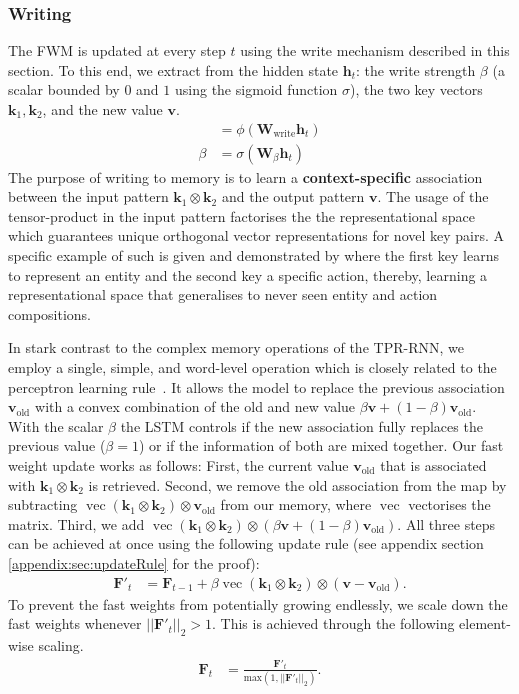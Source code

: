 \documentclass{article} \usepackage{iclr2021_conference,times}
\def\vh{{\bm{h}}}
\def\vk{{\bm{k}}}
\def\vv{{\bm{v}}}
\def\mF{{\bm{F}}}
\def\mW{{\bm{W}}}
\DeclareMathOperator{\vect}{vec}
\begin{document}
\subsubsection{Writing} \label{sec:fwmwiriting}
The FWM is updated at every step $t$ using the write mechanism described in this section.
To this end, we extract from the hidden state $\vh_t$: the write strength $\beta$ (a scalar bounded by $0$ and $1$ using the sigmoid function $\sigma$), the two key vectors $\vk_1, \vk_2$, and the new value $\vv$. 
\begin{align}
    [\vk_1, \vk_2, \vv] &= \phi(\mW_\text{write}\vh_t) \\
    \beta &= \sigma(\mW_\beta\vh_t)
\end{align}
The purpose of writing to memory is to learn a \textbf{context-specific} association between the input pattern $\vk_1 \otimes \vk_2$ and the output pattern $\vv$. 
The usage of the tensor-product in the input pattern factorises the the representational space which guarantees unique orthogonal vector representations for novel key pairs.
A specific example of such is given and demonstrated by \citet{schlag2018nips} where the first key learns to represent an entity and the second key a specific action, thereby, learning a representational space that generalises to never seen entity and action compositions.

In stark contrast to the complex memory operations of the TPR-RNN, we employ a single, simple, and word-level operation which is closely related to the perceptron learning rule~\citep{rosenblatt1958perceptron}. It allows the model to replace the previous association $\vv_\text{old}$ with a convex combination of the old and new value $\beta \vv + (1-\beta)\vv_\text{old}$.
With the scalar $\beta$ the LSTM controls if the new association fully replaces the previous value ($\beta=1$) or if the information of both are mixed together.
Our fast weight update works as follows:
First, the current value $\vv_\text{old}$ that is associated with $\vk_1 \otimes \vk_2$ is retrieved.
Second, we remove the old association from the map by subtracting $\vect(\vk_1 \otimes \vk_2) \otimes \vv_\text{old}$ from our memory, where $\vect$ vectorises the matrix.
Third, we add $\vect(\vk_1 \otimes \vk_2) \otimes (\beta \vv + (1-\beta)\vv_\text{old})$.
All three steps can be achieved at once using the following update rule (see appendix section \ref{appendix:sec:updateRule} for the proof):
\begin{align}
    \mF'_{t} &= \mF_{t-1} + \beta \vect(\vk_1 \otimes \vk_2) \otimes (\vv - \vv_\text{old}).
\end{align}
To prevent the fast weights from potentially growing endlessly, we scale down the fast weights whenever $||\mF'_t||_2 > 1$. This is achieved through the following element-wise scaling.
\begin{align}
    \mF_{t} &= \frac{\mF'_{t}}{\text{max}(1, ||\mF'_t||_2)}.
\end{align}
\end{document}
